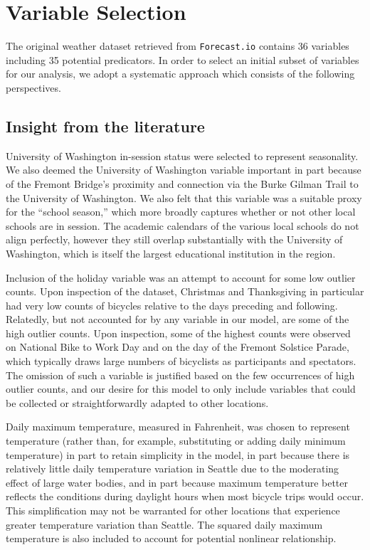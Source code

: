 \documentclass [11pt, proquest] {uwthesis}[2015/03/03]
\begin{document}
\section{Variable Selection}

The original weather dataset retrieved from \texttt{Forecast.io} contains 36 variables including 35 potential predicators. In order to select an initial subset of variables for our analysis, we adopt a systematic approach which consists of the following perspectives.

\subsection{Insight from the literature}
University of Washington in-session status were selected to represent seasonality.
We also deemed the University of Washington variable important in part
because of the Fremont Bridge's proximity and connection via the Burke
Gilman Trail to the University of Washington. We also felt that this
variable was a suitable proxy for the ``school season,'' which more
broadly captures whether or not other local schools are in session.
The academic calendars of the various local schools do not align
perfectly, however they still overlap substantially with the
University of Washington, which is itself the largest educational
institution in the region.

Inclusion of the holiday variable was an attempt to account for
some low outlier counts. Upon inspection of the dataset, Christmas and
Thanksgiving in particular had very low counts of bicycles relative to
the days preceding and following. Relatedly, but not accounted for by
any variable in our model, are some of the high outlier counts. Upon
inspection, some of the highest counts were observed on National Bike
to Work Day and on the day of the Fremont Solstice Parade, which
typically draws large numbers of bicyclists as participants and
spectators. The omission of such a variable is justified based on the
few occurrences of high outlier counts, and our desire for this model
to only include variables that could be collected or straightforwardly
adapted to other locations.

Daily maximum temperature, measured in Fahrenheit, was chosen to
represent temperature (rather than, for example, substituting or
adding daily minimum temperature) in part to retain simplicity in the
model, in part because there is relatively little daily temperature
variation in Seattle due to the moderating effect of large water
bodies, and in part because maximum temperature better reflects the
conditions during daylight hours when most bicycle trips would occur.
This simplification may not be warranted for other locations that
experience greater temperature variation than Seattle. The squared daily maximum temperature is also included to account for potential nonlinear relationship.
\end{document}
